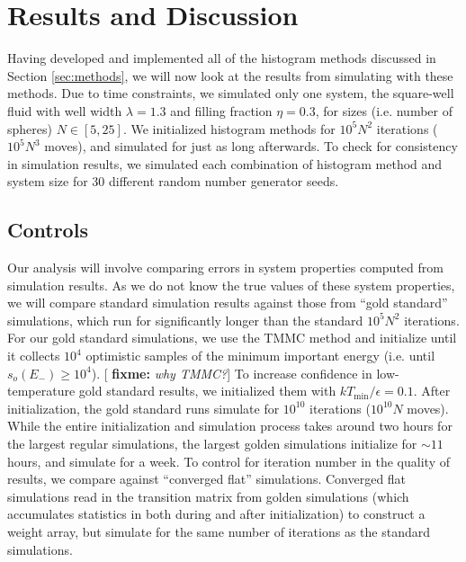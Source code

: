 \documentclass[11pt]{article}
\renewcommand{\t}{\text} %
\newcommand{\p}[1]{\left(#1\right)} %
\renewcommand{\sp}[1]{\left[#1\right]} %
\newcommand{\red}[1]{{\bf \color{red} #1}}
\newcommand{\fixme}[1]{[\red{fixme:} \emph{#1}]}
\begin{document}
\section{Results and Discussion}
\label{sec:results}

Having developed and implemented all of the histogram methods
discussed in Section \ref{sec:methods}, we will now look at the
results from simulating with these methods. Due to time constraints,
we simulated only one system, the square-well fluid with well width
$\lambda=1.3$ and filling fraction $\eta=0.3$, for sizes (i.e. number
of spheres) $N\in\sp{5,25}$. We initialized histogram methods for
$10^5N^2$ iterations ($10^5N^3$ moves), and simulated for just as long
afterwards. To check for consistency in simulation results, we
simulated each combination of histogram method and system size for 30
different random number generator seeds.

\subsection{Controls}
\label{sec:controls}

Our analysis will involve comparing errors in system properties
computed from simulation results. As we do not know the true values of
these system properties, we will compare standard simulation results
against those from ``gold standard'' simulations, which run for
significantly longer than the standard $10^5N^2$ iterations. For our
gold standard simulations, we use the TMMC method and initialize until
it collects $10^4$ optimistic samples of the minimum important energy
(i.e. until $s_o\p{E_-}\ge 10^4$). \fixme{why TMMC?} To increase
confidence in low-temperature gold standard results, we initialized
them with $kT_{\t{min}}/\epsilon=0.1$. After initialization, the gold
standard runs simulate for $10^{10}$ iterations ($10^{10}N$
moves). While the entire initialization and simulation process takes
around two hours for the largest regular simulations, the largest
golden simulations initialize for $\sim11$ hours, and simulate for a
week. To control for iteration number in the quality of results, we
compare against ``converged flat'' simulations. Converged flat
simulations read in the transition matrix from golden simulations
(which accumulates statistics in both during and after initialization)
to construct a weight array, but simulate for the same number of
iterations as the standard simulations.
\end{document}
